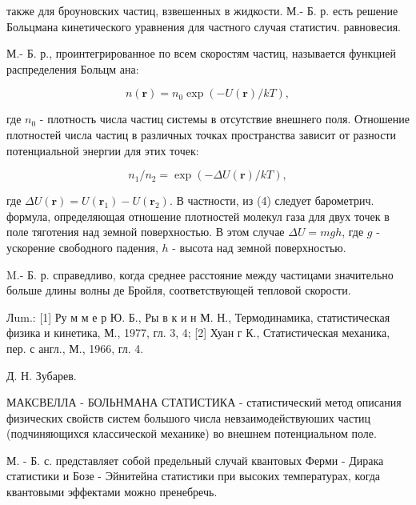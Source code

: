 \documentclass[10pt]{article}
\begin{document}
также для броуновских частиц, взвешенных в жидкости. М.- Б. р. есть решение Больцмана кинетического уравнения для частного случая статистич. равновесия.



М.- Б. р., проинтегрированное по всем скоростям частиц, называется функцией распределения Больцм ана:



\[

n(\boldsymbol{r})=n_{0} \exp (-U(\boldsymbol{r}) / k T),

\]



где $n_{0}$ - плотность числа частиц системы в отсутствие внешнего поля. Отношение плотностей числа частиц в различных точках пространства зависит от разности потенциальной энергии для этих точек:



\[

n_{1} / n_{2}=\exp (-\Delta U(\boldsymbol{r}) / k T),

\]



где $\Delta U(\boldsymbol{r})=U\left(\boldsymbol{r}_{1}\right)-U\left(\boldsymbol{r}_{2}\right)$. В частности, из (4) следует барометрич. формула, определяющая отношение плотностей молекул газа для двух точек в поле тяготения над земной поверхностью. В этом случае $\Delta U=m g h$, где $g$ - ускорение свободного падения, $h$ - высота над земной поверхностью.



M.- Б. р. справедливо, когда среднее расстояние между частицами значительно больше длины волны де Бройля, соответствующей тепловой скорости.



Лum.: [1] Ру м м е р Ю. Б., Ры в к и н М. Н., Термодинамика, статистическая физика и кинетика, М., 1977, гл. 3, 4; [2] Хуан г К., Статистическая механика, пер. с англ., М., 1966, гл. 4.



Д. Н. Зубарев.



МАКСВЕЛЛА - БОЛЬНМАНА СТАТИСТИКА - статистический метод описания физических свойств систем большого числа невзаимодействуюших частиц (подчиняющихся классической механике) во внешнем потенциальном поле.



М. - Б. с. представляет собой предельный случай квантовых Ферми - Дирака статистики и Бозе - Эйнитейна статистики при высоких температурах, когда квантовыми эффектами можно пренебречь.
\end{document}
